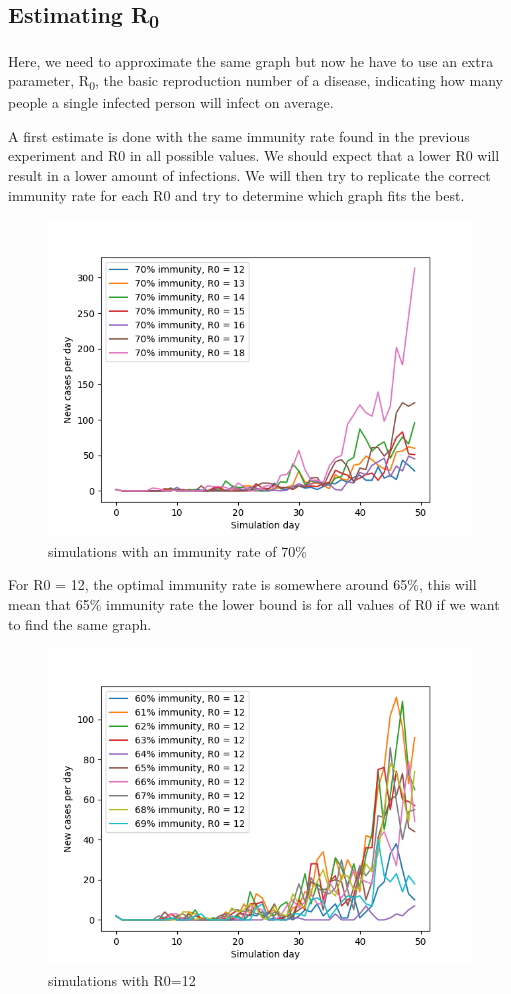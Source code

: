 \documentclass[runningheads]{llncs}
\begin{document}
\subsection{Estimating R\textsubscript{0}}
Here, we need to approximate the same graph but now he have to use an extra parameter, R\textsubscript{0}, the basic reproduction number of a disease, indicating how many people a single infected person will infect on average.

A first estimate is done with the same immunity rate found in the previous experiment and R0 in all possible values. We should expect that a lower R0 will result in a lower amount of infections. We will then try to replicate the correct immunity rate for each R0 and try to determine which graph fits the best.

\begin{figure}
	\includegraphics[width=\textwidth]{test_R0_immunity_70.png}
	\caption{simulations with an immunity rate of 70\%}
\end{figure}

\newpage
\noindent
For R0 = 12, the optimal immunity rate is somewhere around 65\%, this will mean that 65\% immunity rate the lower bound is for all values of R0 if we want to find the same graph.
\begin{figure}
	\includegraphics[width=\textwidth]{test_R0_12.png}
	\caption{simulations with R0=12}
\end{figure}
\end{document}
